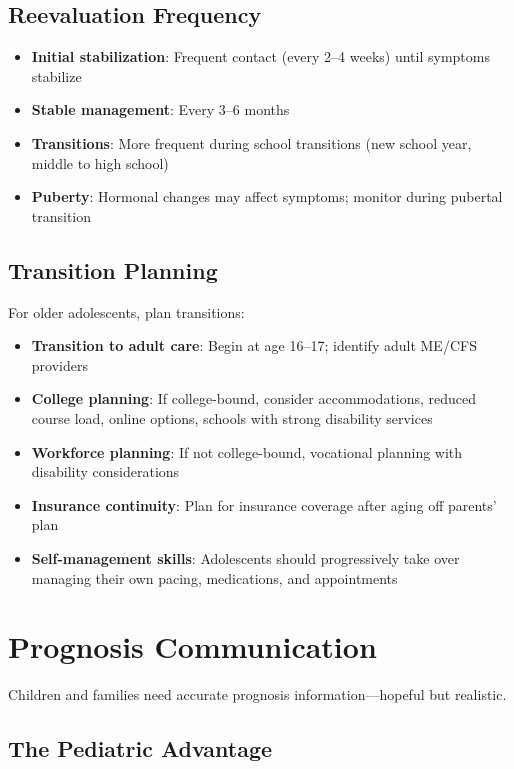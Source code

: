 \subsection{Reevaluation Frequency}

\begin{itemize}
    \item \textbf{Initial stabilization}: Frequent contact (every 2--4 weeks) until symptoms stabilize
    \item \textbf{Stable management}: Every 3--6 months
    \item \textbf{Transitions}: More frequent during school transitions (new school year, middle to high school)
    \item \textbf{Puberty}: Hormonal changes may affect symptoms; monitor during pubertal transition
\end{itemize}

\subsection{Transition Planning}

For older adolescents, plan transitions:

\begin{itemize}
    \item \textbf{Transition to adult care}: Begin at age 16--17; identify adult ME/CFS providers
    \item \textbf{College planning}: If college-bound, consider accommodations, reduced course load, online options, schools with strong disability services
    \item \textbf{Workforce planning}: If not college-bound, vocational planning with disability considerations
    \item \textbf{Insurance continuity}: Plan for insurance coverage after aging off parents' plan
    \item \textbf{Self-management skills}: Adolescents should progressively take over managing their own pacing, medications, and appointments
\end{itemize}

\section{Prognosis Communication}
\label{sec:ped-prognosis-communication}

Children and families need accurate prognosis information---hopeful but realistic.

\subsection{The Pediatric Advantage}

